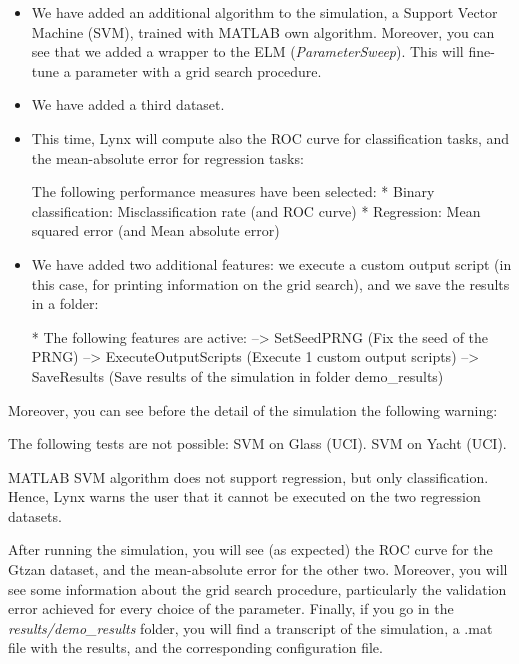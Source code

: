 \begin{itemize}
\item We have added an additional algorithm to the simulation, a Support Vector Machine (SVM), trained with MATLAB own algorithm. Moreover, you can see that we added a wrapper to the ELM (\textit{ParameterSweep}). This will fine-tune a parameter with a grid search procedure.
\item We have added a third dataset.
\item This time, Lynx will compute also the ROC curve for classification tasks, and the mean-absolute error for regression tasks:

\begin{console}
The following performance measures have been selected:
	 * Binary classification: Misclassification rate 
	 	(and ROC curve)
	 * Regression: Mean squared error 
	 	(and Mean absolute error)
\end{console}

\item We have added two additional features: we execute a custom output script (in this case, for printing information on the grid search), and we save the results in a folder:

\begin{console}
* The following features are active: 
  --> SetSeedPRNG (Fix the seed of the PRNG) 
  --> ExecuteOutputScripts (Execute 1 custom output scripts) 
  --> SaveResults (Save results of the simulation in folder demo_results) 
\end{console}

\end{itemize}

Moreover, you can see before the detail of the simulation the following warning:

\begin{console}
The following tests are not possible:
   SVM on Glass (UCI).
   SVM on Yacht (UCI).
\end{console}

MATLAB SVM algorithm does not support regression, but only classification. Hence, Lynx warns the user that it cannot be executed on the two regression datasets. 

After running the simulation, you will see (as expected) the ROC curve for the Gtzan dataset, and the mean-absolute error for the other two. Moreover, you will see some information about the grid search procedure, particularly the validation error achieved for every choice of the parameter. Finally, if you go in the \textit{results/demo\_results} folder, you will find a transcript of the simulation, a .mat file with the results, and the corresponding configuration file.

